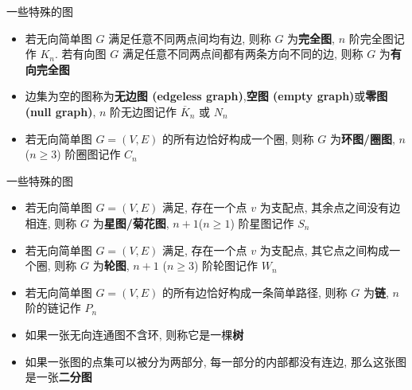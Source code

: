 \begin{frame}{一些特殊的图}
	\begin{itemize}
		\item<1-> 若无向简单图 \(G\) 满足任意不同两点间均有边, 则称 \(G\) 为\textbf{完全图}, \(n\) 阶完全图记作 \(K_n\). 若有向图 \(G\) 满足任意不同两点间都有两条方向不同的边, 则称 \(G\) 为\textbf{有向完全图}
		\item<2-> 边集为空的图称为\textbf{无边图 (edgeless graph)},\textbf{空图 (empty graph)}或\textbf{零图 (null graph)}, \(n\) 阶无边图记作 \(\overline{K}_n\) 或 \(N_n\)

		\item<4-> 若无向简单图 \(G = \left( V, E \right)\) 的所有边恰好构成一个圈, 则称 \(G\) 为\textbf{环图/圈图}, \(n\)(\(n \geq 3\)) 阶圈图记作 \(C_n\)

	\end{itemize}
\end{frame}


\begin{frame}{一些特殊的图}
	\begin{itemize}
		\item<1-> 若无向简单图 \(G = \left( V, E \right)\) 满足, 存在一个点 \(v\) 为支配点, 其余点之间没有边相连, 则称 \(G\) 为\textbf{星图/菊花图}, \(n + 1\)(\(n \geq 1\)) 阶星图记作 \(S_n\)
		\item<2-> 若无向简单图 \(G = \left( V, E \right)\) 满足, 存在一个点 \(v\) 为支配点, 其它点之间构成一个圈, 则称 \(G\) 为\textbf{轮图}, \(n + 1\) (\(n \geq 3\)) 阶轮图记作 \(W_n\)
		\item<3-> 若无向简单图 \(G = \left( V, E \right)\) 的所有边恰好构成一条简单路径, 则称 \(G\) 为\textbf{链}, \(n\) 阶的链记作 \(P_n\)
		\item<4-> 如果一张无向连通图不含环, 则称它是一棵\textbf{树}
		\item<5-> 如果一张图的点集可以被分为两部分, 每一部分的内部都没有连边, 那么这张图是一张\textbf{二分图}

	\end{itemize}
\end{frame}
